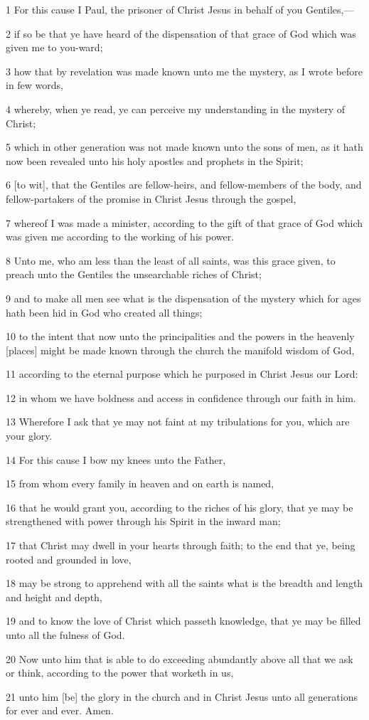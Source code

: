 \par 1 For this cause I Paul, the prisoner of Christ Jesus in behalf of you Gentiles,—
\par 2 if so be that ye have heard of the dispensation of that grace of God which was given me to you-ward;
\par 3 how that by revelation was made known unto me the mystery, as I wrote before in few words,
\par 4 whereby, when ye read, ye can perceive my understanding in the mystery of Christ;
\par 5 which in other generation was not made known unto the sons of men, as it hath now been revealed unto his holy apostles and prophets in the Spirit;
\par 6 [to wit], that the Gentiles are fellow-heirs, and fellow-members of the body, and fellow-partakers of the promise in Christ Jesus through the gospel,
\par 7 whereof I was made a minister, according to the gift of that grace of God which was given me according to the working of his power.
\par 8 Unto me, who am less than the least of all saints, was this grace given, to preach unto the Gentiles the unsearchable riches of Christ;
\par 9 and to make all men see what is the dispensation of the mystery which for ages hath been hid in God who created all things;
\par 10 to the intent that now unto the principalities and the powers in the heavenly [places] might be made known through the church the manifold wisdom of God,
\par 11 according to the eternal purpose which he purposed in Christ Jesus our Lord:
\par 12 in whom we have boldness and access in confidence through our faith in him.
\par 13 Wherefore I ask that ye may not faint at my tribulations for you, which are your glory.
\par 14 For this cause I bow my knees unto the Father,
\par 15 from whom every family in heaven and on earth is named,
\par 16 that he would grant you, according to the riches of his glory, that ye may be strengthened with power through his Spirit in the inward man;
\par 17 that Christ may dwell in your hearts through faith; to the end that ye, being rooted and grounded in love,
\par 18 may be strong to apprehend with all the saints what is the breadth and length and height and depth,
\par 19 and to know the love of Christ which passeth knowledge, that ye may be filled unto all the fulness of God.
\par 20 Now unto him that is able to do exceeding abundantly above all that we ask or think, according to the power that worketh in us,
\par 21 unto him [be] the glory in the church and in Christ Jesus unto all generations for ever and ever. Amen.

